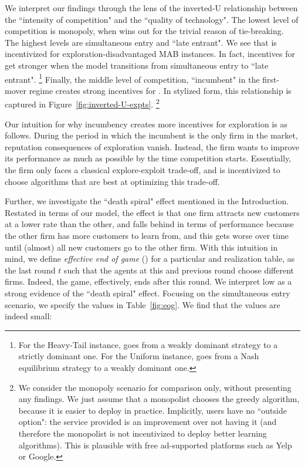 \documentclass[../competing_bandits_with_appendix.tex]{subfiles}
\begin{document}
We interpret our findings through the lens of the inverted-U relationship between the ``intensity of competition" and the ``quality of technology". The lowest level of competition is monopoly, when \DynamicGreedy wins out for the trivial reason of tie-breaking. The highest levels are simultaneous entry and ``late entrant". We see that \DynamicGreedy is incentivized for exploration-disadvantaged MAB instances. In fact, incentives for \DynamicGreedy get stronger when the model transitions from simultaneous entry to ``late entrant".%
\footnote{For the Heavy-Tail instance, \DynamicGreedy goes from a weakly dominant strategy to a strictly dominant one. For the Uniform instance, \DynamicGreedy goes from a Nash equilibrium strategy to a weakly dominant one.}
Finally, the middle level of competition, ``incumbent" in the first-mover regime creates strong incentives for \Thompson. In stylized form, this relationship is captured in Figure~\ref{fig:inverted-U-expts}.%
\footnote{We consider the monopoly scenario for comparison only, without presenting any findings. We just assume that a monopolist chooses
the greedy algorithm, because it is easier to deploy in practice. Implicitly, users have no ``outside option": the service provided is an improvement over not having it (and therefore the monopolist is not incentivized to deploy better learning algorithms). This is plausible with free ad-supported platforms such as Yelp or Google.}



Our intuition for why incumbency creates more incentives for exploration is as follows. During the period in which the incumbent is the only firm in the market, reputation consequences of exploration vanish. Instead, the firm wants to improve its performance as much as possible by the time competition starts. Essentially, the firm only faces a classical explore-exploit trade-off, and is incentivized to choose algorithms that are best at optimizing this trade-off.

Further, we investigate the ``death spiral" effect mentioned in the Introduction. Restated in terms of our model, the effect is that one firm attracts new customers at a lower rate than the other, and falls behind in terms of performance because the other firm has more customers to learn from, and this gets worse over time until (almost) all new customers go to the other firm. With this intuition in mind, we define  \textit{effective end of game} (\Eeog) for a particular \MRV and realization table, as the last round $t$ such that the agents at this and previous round choose different firms. Indeed, the game, effectively, ends after this round. We interpret low \Eeog as a strong evidence of the ``death spiral" effect. Focusing on the simultaneous entry scenario, we specify the \Eeog values in Table~\ref{fig:eog}. We find that the \Eeog values are indeed small:
\end{document}
